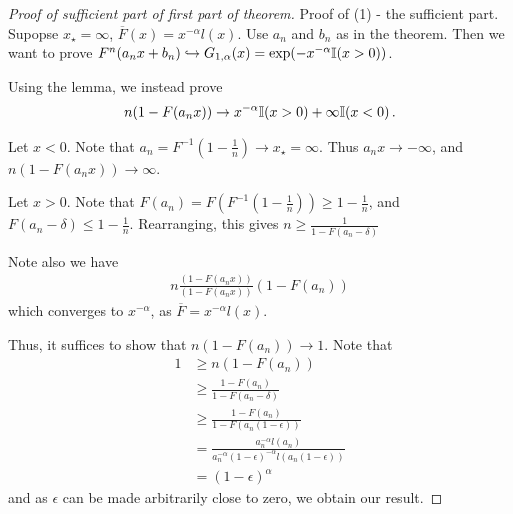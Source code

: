 \begin{proof}[Proof of sufficient part of first part of theorem]
  Proof of (1) - the sufficient part.  Supopse $x_{\star} = \infty$,
  $\overline F(x) = x^{-\alpha} l(x)$.  Use $a_{n}$ and $b_{n}$ as in
  the theorem.  Then we want to prove $F^{n}(a_{n} x + b_{n})
  \hookrightarrow G_{1, \alpha}(x) = \exp(-x^{-\alpha} \I{x > 0})$.

  Using the lemma, we instead prove
  \begin{align}
    \label{eq:127}
    n(1 - F(a_{n} x)) \rightarrow x^{-\alpha} \I{x > 0} + \infty \I{x
      < 0}.
  \end{align}

  Let $x < 0$.  Note that $a_{n} = F^{-1}(1 - \frac{1}{n}) \rightarrow
  x_{\star} = \infty$.  Thus $a_{n} x \rightarrow - \infty$, and $n(1
  - F(a_{n} x)) \rightarrow \infty$.

  Let $x > 0$. Note that $F(a_{n}) = F(F^{-1}(1 - \frac{1}{n})) \geq 1
  - \frac{1}{n}$, and $F(a_{n} - \delta) \leq 1 - \frac{1}{n}$.
  Rearranging, this gives $n \geq \frac{1}{1 - F(a_{n} - \delta)}$

  Note also we have
  \begin{align}
    \label{eq:128}
    n \frac{(1-F(a_{n} x))}{(1 - F(a_{n} x))} (1 - F(a_{n}))
  \end{align}
  which converges to $x^{-\alpha}$, as $\overline F = x^{-\alpha} l(x)$.

  Thus, it suffices to show that $n(1 - F(a_{n})) \rightarrow 1$.
  Note that
  \begin{align}
    \label{eq:129}
    1 &\geq n(1 - F(a_{n})) \\
    &\geq \frac{1-F(a_{n})}{1 - F(a_{n} - \delta)} \\
    &\geq \frac{1 - F(a_{n})}{1 - F(a_{n}(1 - \epsilon))}  \\
    &= \frac{a_{n}^{-\alpha} l(a_{n})}{a_{n}^{-\alpha}
      (1-\epsilon)^{-\alpha}l(a_{n}(1 - \epsilon))} \\
    &= (1 - \epsilon)^{\alpha}
  \end{align}
  and as $\epsilon$ can be made arbitrarily close to zero, we obtain
  our result.
\end{proof}

